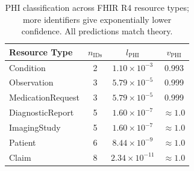 
\begin{table}[t]
\centering
\caption{PHI classification across FHIR R4 resource types; more identifiers give exponentially lower confidence. All predictions match theory.}
\label{tab:cross_resource}
\footnotesize
\begin{tabular}{@{}lccc@{}}
\toprule
Resource Type & $n_{\text{IDs}}$ & $l_{\text{PHI}}$ & $v_{\text{PHI}}$ \\
\midrule
Condition           & 2 & $1.10 \times 10^{-3}$ & 0.993 \\
Observation         & 3 & $5.79 \times 10^{-5}$ & 0.999 \\
MedicationRequest   & 3 & $5.79 \times 10^{-5}$ & 0.999 \\
DiagnosticReport    & 5 & $1.60 \times 10^{-7}$ & $\approx 1.0$ \\
ImagingStudy        & 5 & $1.60 \times 10^{-7}$ & $\approx 1.0$ \\
Patient             & 6 & $8.44 \times 10^{-9}$ & $\approx 1.0$ \\
Claim               & 8 & $2.34 \times 10^{-11}$ & $\approx 1.0$ \\
\bottomrule
\end{tabular}
\end{table}
